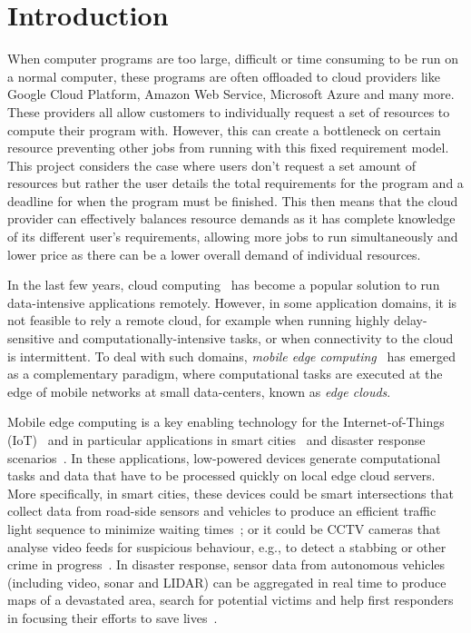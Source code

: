 \documentclass[sotoncolour]{uosproject}     %
\begin{document}
\mainmatter
\chapter{Introduction}\label{ch:introduction}
When computer programs are too large, difficult or time consuming to be run on a normal computer, these programs are
often offloaded to cloud providers like Google Cloud Platform, Amazon Web Service, Microsoft Azure and many more.
These providers all allow customers to individually request a set of resources to compute their program with. However,
this can create a bottleneck on certain resource preventing other jobs from running with this fixed requirement model.
This project considers the case where users don't request a set amount of resources but rather the user details the
total requirements for the program and a deadline for when the program must be finished. This then means that the cloud
provider can effectively balances resource demands as it has complete knowledge of its different user's requirements,
allowing more jobs to run simultaneously and lower price as there can be a lower overall demand of individual resources.

In the last few years, cloud computing~\cite{cloud_cite} has become a popular solution to run data-intensive
applications remotely. However, in some application domains, it is not feasible to rely a remote cloud, for example when
running highly delay-sensitive and computationally-intensive tasks, or when connectivity to the cloud is intermittent.
To deal with such domains, \emph{mobile edge computing}~\cite{mobile_edge_survey} has emerged as a complementary
paradigm, where computational tasks are executed at the edge of mobile networks at small data-centers, known as
\emph{edge clouds}.

Mobile edge computing is a key enabling technology for the Internet-of-Things (IoT)~\cite{mobile_edge_IoT} and in
particular applications in smart cities~\cite{mobile_edge_smart} and disaster response
scenarios~\cite{mobile_edge_disaster}. In these applications, low-powered devices generate computational tasks and
data that have to be processed quickly on local edge cloud servers. More specifically, in smart cities, these devices
could be smart intersections that collect data from road-side sensors and vehicles to produce an efficient traffic
light sequence to minimize waiting times~\cite{smart_cities_traffic_lights}; or it could be CCTV cameras that analyse
video feeds for suspicious behaviour, e.g., to detect a stabbing or other crime in progress~\cite{Sreenu2019}. In
disaster response, sensor data from autonomous vehicles (including video, sonar and LIDAR) can be aggregated in real
time to produce maps of a devastated area, search for potential victims and help first responders in focusing their
efforts to save lives~\cite{smart_disaster_management}.
\end{document}
